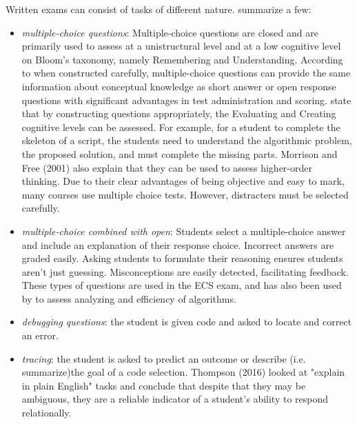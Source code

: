 Written exams can consist of tasks of different nature.  summarize a few:
\begin{itemize}
\item \emph{multiple-choice questions}: Multiple-choice questions are closed and are primarily used to assess at a unistructural level \cite{Zhong2016} and at a low cognitive level on Bloom's taxonomy, namely Remembering and Understanding\cite{zur-burgury2013israelExam}. According to  when constructed carefully, multiple-choice questions can provide the same information about conceptual knowledge as short answer or open response questions with significant advantages in test administration and scoring. \cite{zur-burgury2013israelExam} state that by constructing questions appropriately, the Evaluating and Creating cognitive levels can be assessed. For example, for a student to complete the skeleton of a script, the students need to understand the algorithmic problem, the proposed solution, and must complete the missing parts. Morrison and Free (2001) also explain that they can be used to assess higher-order thinking. Due to their clear advantages of being objective and easy to mark, many courses use multiple choice tests. However, distracters must be selected carefully.
\item \emph{multiple-choice combined with open}: Students select a multiple-choice answer and include an explanation of their response choice. Incorrect answers are graded easily. Asking students to formulate their reasoning ensures students aren't just guessing. Misconceptions are easily detected, facilitating feedback. These types of questions are used in the ECS exam, and has also been used by \cite{gal2002efficiency} to assess analyzing and efficiency of algorithms.
\item \emph{debugging questions}: the student is given code and asked to locate and correct an error.
\item \emph{tracing}: the student is asked to predict an outcome or describe (i.e. summarize)the goal of a code selection. Thompson (2016) looked at "explain in plain English" tasks and conclude that despite that they may be ambiguous, they are a reliable indicator of a student's ability to respond relationally.


\end{itemize}
